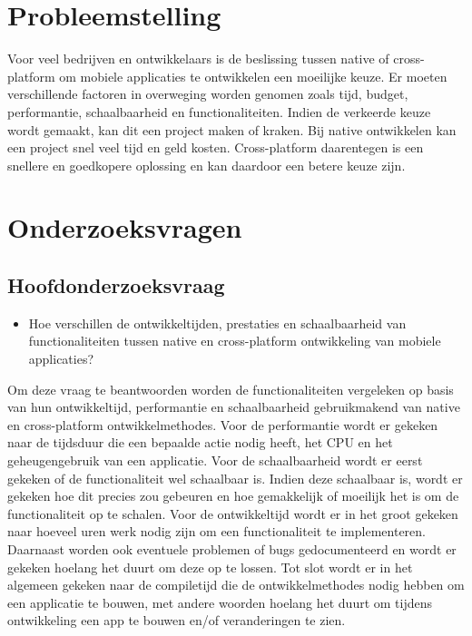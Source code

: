 \section{Probleemstelling}%
\label{sec:probleemstelling}

Voor veel bedrijven en ontwikkelaars is de beslissing tussen native of cross-platform om mobiele applicaties te ontwikkelen een moeilijke keuze. 
Er moeten verschillende factoren in overweging worden genomen zoals tijd, budget, performantie, schaalbaarheid en functionaliteiten. 
Indien de verkeerde keuze wordt gemaakt, kan dit een project maken of kraken. Bij native ontwikkelen kan een project snel veel tijd en geld kosten. 
Cross-platform daarentegen is een snellere en goedkopere oplossing en kan daardoor een betere keuze zijn.

\section{Onderzoeksvragen}%
\label{sec:onderzoeksvraag}

\subsection{Hoofdonderzoeksvraag}
\begin{itemize}
    \item Hoe verschillen de ontwikkeltijden, prestaties en schaalbaarheid van functionaliteiten tussen native en cross-platform ontwikkeling van mobiele applicaties?
\end{itemize}
Om deze vraag te beantwoorden worden de functionaliteiten vergeleken op basis van hun ontwikkeltijd, 
performantie en schaalbaarheid gebruikmakend van native en cross-platform ontwikkelmethodes. 
Voor de performantie wordt er gekeken naar de tijdsduur die een bepaalde actie nodig heeft, het CPU en het geheugengebruik van een applicatie.
Voor de schaalbaarheid wordt er eerst gekeken of de functionaliteit wel schaalbaar is. 
Indien deze schaalbaar is, wordt er gekeken hoe dit precies zou gebeuren en hoe gemakkelijk of moeilijk het is om de functionaliteit op te schalen. 
Voor de ontwikkeltijd wordt er in het groot gekeken naar hoeveel uren werk nodig zijn om een functionaliteit te implementeren. 
Daarnaast worden ook eventuele problemen of bugs gedocumenteerd en wordt er gekeken hoelang het duurt om deze op te lossen. 
Tot slot wordt er in het algemeen gekeken naar de compiletijd die de ontwikkelmethodes nodig hebben om een applicatie te bouwen,
met andere woorden hoelang het duurt om tijdens ontwikkeling een app te bouwen en/of veranderingen te zien.


